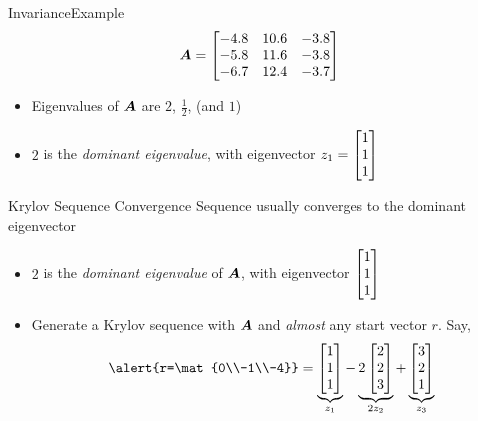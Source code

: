 \documentclass{beamer}
\begin{document}
\begin{frame}{Invariance}{Example}%
\[
\bm{A} = \begin{bmatrix}  -4.8 & 10.6 & -3.8 \\ -5.8 & 11.6 & -3.8 \\ -6.7 & 12.4 & -3.7 \end{bmatrix} 
\]

	\begin{itemize}
		\item Eigenvalues of $\bm{A}$ are $2$, $\frac{1}{2}$, (and $1$)
		\item $2$ is the \emph{dominant eigenvalue}, with eigenvector $z_1=\begin{bmatrix} 1\\1\\1\end{bmatrix}$
	\end{itemize}

\end{frame}


\begin{frame}{Krylov Sequence Convergence}
Sequence usually converges to the dominant eigenvector
\bigskip 

\begin{itemize}
	\item $2$ is the \emph{dominant eigenvalue} of $\bm{A}$, with eigenvector
	$\begin{bmatrix} 1\\1\\1\end{bmatrix}$

\medskip
\item Generate a Krylov sequence with $\bm{A}$ and \emph{almost} any start vector $r$.
Say,
\[ 
\alert{r=\mat{0\\-1\\-4}} = \underbrace{\mat{1\\1\\1}}_{z_1} 
- \underbrace{2\mat{2\\2\\3}}_{2z_2} + \underbrace{\mat{3\\2\\1}}_{z_3}
\]
\end{itemize}
\end{frame}
\end{document}
